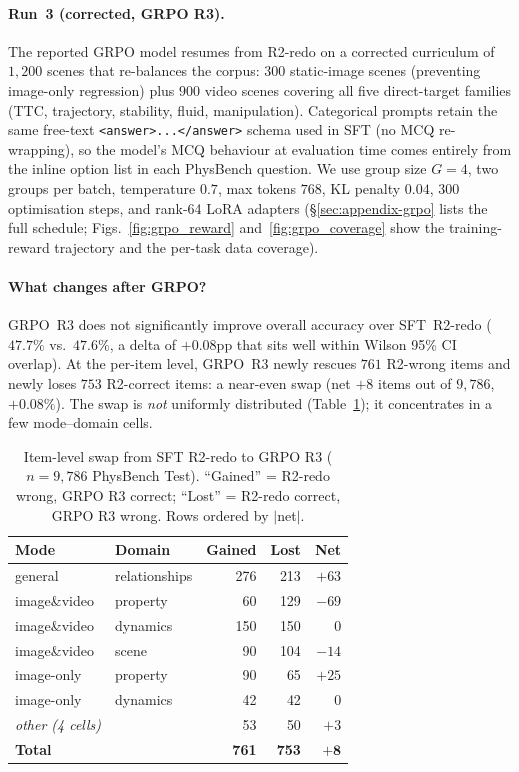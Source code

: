 \documentclass{article}
\begin{document}
\paragraph{Run~3 (corrected, GRPO R3).} The reported GRPO model
resumes from R2-redo on a corrected curriculum of $1{,}200$ scenes
that re-balances the corpus: $300$ static-image scenes (preventing
image-only regression) plus $900$ video scenes covering all
five direct-target families (TTC, trajectory, stability, fluid,
manipulation). Categorical prompts retain the same free-text
\texttt{<answer>...</answer>} schema used in SFT (no MCQ
re-wrapping), so the model's MCQ behaviour at evaluation time comes
entirely from the inline option list in each PhysBench question.
We use group size $G{=}4$, two groups per batch, temperature $0.7$,
max tokens $768$, KL penalty $0.04$, $300$ optimisation steps, and
rank-64 LoRA adapters
(\S\ref{sec:appendix-grpo} lists the full schedule;
Figs.~\ref{fig:grpo_reward} and~\ref{fig:grpo_coverage} show the
training-reward trajectory and the per-task data coverage).

\paragraph{What changes after GRPO?} GRPO~R3 does not significantly
improve overall accuracy over SFT~R2-redo ($47.7\%$ vs.\ $47.6\%$,
a delta of $+0.08$pp that sits well within Wilson 95\% CI overlap).
At the per-item level, GRPO~R3 newly rescues $761$ R2-wrong items and
newly loses $753$ R2-correct items: a near-even swap (net $+8$ items
out of $9{,}786$, $+0.08\%$). The swap is \emph{not} uniformly
distributed (Table~\ref{tab:r2_grpo_swap}); it concentrates in a few
mode--domain cells.

\begin{table}[t]
\caption{Item-level swap from SFT R2-redo to GRPO R3 ($n{=}9{,}786$
PhysBench Test). ``Gained'' = R2-redo wrong, GRPO R3 correct; ``Lost''
= R2-redo correct, GRPO R3 wrong. Rows ordered by $|$net$|$.}
\label{tab:r2_grpo_swap}
\centering
\footnotesize
\setlength{\tabcolsep}{4pt}
\begin{tabular}{llrrr}
\toprule
Mode & Domain & Gained & Lost & Net \\
\midrule
general      & relationships  & 276 & 213 & $+63$ \\
image\&video & property       & 60  & 129 & $-69$ \\
image\&video & dynamics       & 150 & 150 & $0$ \\
image\&video & scene          & 90  & 104 & $-14$ \\
image-only   & property       & 90  & 65  & $+25$ \\
image-only   & dynamics       & 42  & 42  & $0$ \\
\textit{other (4 cells)} &    & 53  & 50  & $+3$ \\
\midrule
\textbf{Total} &              & \textbf{761} & \textbf{753} & $\mathbf{+8}$ \\
\bottomrule
\end{tabular}
\end{table}
\end{document}

